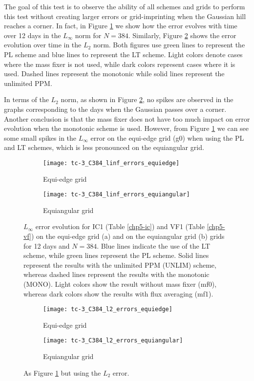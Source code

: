 The goal of this test is to observe the ability of all schemes and grids to perform this test without creating
larger errors or grid-imprinting when the Gaussian hill reaches a corner.
In fact, in Figure \ref{chp-advcs-sec-exp-adv2-evol-linf} we show how the error evolves with time over 12 days in the $L_{\infty}$ norm for $N=384$.
Similarly, Figure \ref{chp-advcs-sec-exp-adv2-evol-l2} shows the error evolution over time in the $L_2$ norm.
Both figures use green lines to represent the PL scheme and blue lines to represent the LT scheme.
Light colors denote cases where the mass fixer is not used, while dark colors represent cases where it is used. 
Dashed lines represent the monotonic while solid lines represent the unlimited PPM.

In terms of the $L_2$ norm, as shown in Figure \ref{chp-advcs-sec-exp-adv2-evol-l2}, 
no spikes are observed in the graphs corresponding to the days when the Gaussian passes over a corner.
Another conclusion is that the mass fixer does not have too much impact on error evolution when the monotonic scheme is used.
However, from Figure \ref{chp-advcs-sec-exp-adv2-evol-linf} we can see some small spikes in the $L_{\infty}$ error
on the equi-edge grid (g0) when using the PL and LT schemes, which is less pronounced on the equiangular grid.
\begin{figure}[!htb]
	\centering
	\begin{subfigure}{0.45\textwidth}
	\centering
	\texttt{[image: tc-3\_C384\_linf\_errors\_equiedge]}
	\caption{Equi-edge grid}
\end{subfigure}
\begin{subfigure}{0.45\textwidth}
	\centering
	\texttt{[image: tc-3\_C384\_linf\_errors\_equiangular]}
	\caption{Equiangular grid}
\end{subfigure}
	\caption{
		$L_{\infty}$ error evolution for IC1 (Table \ref{chp5-ic}) and VF1 (Table \ref{chp5-vf}) 
		on the equi-edge grid (a) and on the equiangular grid (b) grids for 12 days and $N=384$.
		Blue lines indicate the use of the LT scheme, while green lines represent the PL scheme.
		Solid lines represent the results with the unlimited PPM (UNLIM) scheme, whereas dashed lines represent the results with the monotonic (MONO).
		Light colors show the result without mass fixer (mf0), whereas dark colors show the results with flux averaging (mf1).
		\label{chp-advcs-sec-exp-adv2-evol-linf}}
\end{figure}

\begin{figure}[!htb]
	\centering
	\begin{subfigure}{0.45\textwidth}
		\centering
		\texttt{[image: tc-3\_C384\_l2\_errors\_equiedge]}
		\caption{Equi-edge grid}
	\end{subfigure}
	\begin{subfigure}{0.45\textwidth}
		\centering
		\texttt{[image: tc-3\_C384\_l2\_errors\_equiangular]}
		\caption{Equiangular grid}
	\end{subfigure}
	\caption{As Figure \ref{chp-advcs-sec-exp-adv2-evol-linf} but using the $L_2$ error.\label{chp-advcs-sec-exp-adv2-evol-l2}}
\end{figure}

